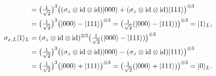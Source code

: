 \documentclass[a4paper, oneside, 12pt]{amsart}
\begin{document}
\begin{remark}
\begin{align*}
    & = \big(\tfrac{1}{\sqrt{2}}\big)^{3} \big((\sigma_{z}\otimes \mathrm{id} \otimes \mathrm{id})\lvert000\rangle + (\sigma_{z}\otimes \mathrm{id} \otimes \mathrm{id}) \lvert111\rangle \big)^{\otimes 3}\\
    & = \big(\tfrac{1}{\sqrt{2}}\big)^{3} \big(\lvert000\rangle - \lvert111\rangle \big)^{\otimes 3}
      =  \big(\tfrac{1}{\sqrt{2}}(\lvert000\rangle - \lvert111\rangle) \big)^{\otimes 3}
      = \lvert1\rangle_{L}, \\
    \sigma_{x,L} \lvert1\rangle_{L}
    & = (\sigma_{z}\otimes \mathrm{id} \otimes \mathrm{id})^{\otimes 3} \big(\tfrac{1}{\sqrt{2}} (\lvert000\rangle - \lvert111\rangle)\big)^{\otimes 3} \\
    & = \big(\tfrac{1}{\sqrt{2}}\big)^{3} \big((\sigma_{z}\otimes \mathrm{id} \otimes \mathrm{id})\lvert000\rangle - (\sigma_{z}\otimes \mathrm{id} \otimes \mathrm{id}) \lvert111\rangle \big)^{\otimes 3}\\
    & = \big(\tfrac{1}{\sqrt{2}}\big)^{3} \big(\lvert000\rangle + \lvert111\rangle \big)^{\otimes 3}
      =  \big(\tfrac{1}{\sqrt{2}}(\lvert000\rangle + \lvert111\rangle) \big)^{\otimes 3}
      = \lvert0\rangle_{L}.
  \end{align*}
\end{remark}
\end{document}
